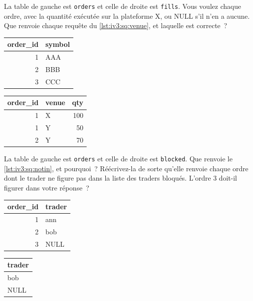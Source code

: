 \begin{question}\label{iq:iv3:sql-and-data:2}
La table de gauche est \texttt{orders} et celle de droite est \texttt{fills}. Vous voulez chaque ordre, avec la quantité exécutée sur la plateforme X, ou NULL s'il n'en a aucune. Que renvoie chaque requête du \cref{lst:iv3:sq:venue}, et laquelle est correcte~?
\begin{center}\small
\begin{tabular}{rl}
order\_id & symbol\\\hline
1 & AAA\\
2 & BBB\\
3 & CCC
\end{tabular}\qquad
\begin{tabular}{rlr}
order\_id & venue & qty\\\hline
1 & X & 100\\
1 & Y & 50\\
2 & Y & 70
\end{tabular}
\end{center}
\label{lst:iv3:sq:venue}
\end{question}

\begin{question}\label{iq:iv3:sql-and-data:3}
La table de gauche est \texttt{orders} et celle de droite est \texttt{blocked}. Que renvoie le \cref{lst:iv3:sq:notin}, et pourquoi~? Réécrivez-la de sorte qu'elle renvoie chaque ordre dont le trader ne figure pas dans la liste des traders bloqués. L'ordre 3 doit-il figurer dans votre réponse~?
\begin{center}\small
\begin{tabular}{rl}
order\_id & trader\\\hline
1 & ann\\
2 & bob\\
3 & NULL
\end{tabular}\qquad
\begin{tabular}{l}
trader\\\hline
bob\\
NULL
\end{tabular}
\end{center}
\label{lst:iv3:sq:notin}
\end{question}

